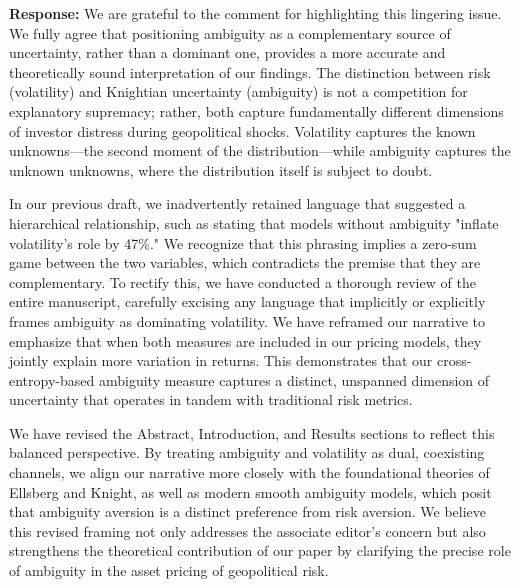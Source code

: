 \documentclass[12pt]{article}
\begin{document}
\begin{highlightbox}
\textbf{Response:} We are grateful to the comment for highlighting this lingering issue. We fully agree that positioning ambiguity as a complementary source of uncertainty, rather than a dominant one, provides a more accurate and theoretically sound interpretation of our findings. The distinction between risk (volatility) and Knightian uncertainty (ambiguity) is not a competition for explanatory supremacy; rather, both capture fundamentally different dimensions of investor distress during geopolitical shocks. Volatility captures the known unknowns---the second moment of the distribution---while ambiguity captures the unknown unknowns, where the distribution itself is subject to doubt. 

In our previous draft, we inadvertently retained language that suggested a hierarchical relationship, such as stating that models without ambiguity "inflate volatility's role by 47\%." We recognize that this phrasing implies a zero-sum game between the two variables, which contradicts the premise that they are complementary. To rectify this, we have conducted a thorough review of the entire manuscript, carefully excising any language that implicitly or explicitly frames ambiguity as dominating volatility. We have reframed our narrative to emphasize that when both measures are included in our pricing models, they jointly explain more variation in returns. This demonstrates that our cross-entropy-based ambiguity measure captures a distinct, unspanned dimension of uncertainty that operates in tandem with traditional risk metrics.

We have revised the Abstract, Introduction, and Results sections to reflect this balanced perspective. By treating ambiguity and volatility as dual, coexisting channels, we align our narrative more closely with the foundational theories of Ellsberg and Knight, as well as modern smooth ambiguity models, which posit that ambiguity aversion is a distinct preference from risk aversion. We believe this revised framing not only addresses the associate editor's concern but also strengthens the theoretical contribution of our paper by clarifying the precise role of ambiguity in the asset pricing of geopolitical risk.
\end{highlightbox}
\end{document}
